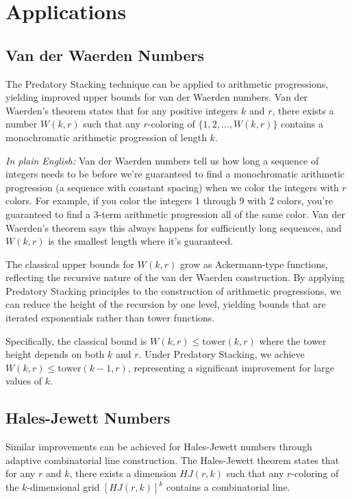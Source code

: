 \documentclass[12pt]{article}
\begin{document}
\section{Applications}

\subsection{Van der Waerden Numbers}
The Predatory Stacking technique can be applied to arithmetic progressions, yielding improved upper bounds for van der Waerden numbers. Van der Waerden's theorem states that for any positive integers $k$ and $r$, there exists a number $W(k,r)$ such that any $r$-coloring of $\{1,2,\ldots,W(k,r)\}$ contains a monochromatic arithmetic progression of length $k$.

\textit{In plain English:} Van der Waerden numbers tell us how long a sequence of integers needs to be before we're guaranteed to find a monochromatic arithmetic progression (a sequence with constant spacing) when we color the integers with $r$ colors. For example, if you color the integers 1 through 9 with 2 colors, you're guaranteed to find a 3-term arithmetic progression all of the same color. Van der Waerden's theorem says this always happens for sufficiently long sequences, and $W(k,r)$ is the smallest length where it's guaranteed.

The classical upper bounds for $W(k,r)$ grow as Ackermann-type functions, reflecting the recursive nature of the van der Waerden construction. By applying Predatory Stacking principles to the construction of arithmetic progressions, we can reduce the height of the recursion by one level, yielding bounds that are iterated exponentials rather than tower functions.

Specifically, the classical bound is $W(k,r) \leq \text{tower}(k,r)$ where the tower height depends on both $k$ and $r$. Under Predatory Stacking, we achieve $W(k,r) \leq \text{tower}(k-1,r)$, representing a significant improvement for large values of $k$.

\subsection{Hales-Jewett Numbers}
Similar improvements can be achieved for Hales-Jewett numbers through adaptive combinatorial line construction. The Hales-Jewett theorem states that for any $r$ and $k$, there exists a dimension $HJ(r,k)$ such that any $r$-coloring of the $k$-dimensional grid $[HJ(r,k)]^k$ contains a combinatorial line.
\end{document}
